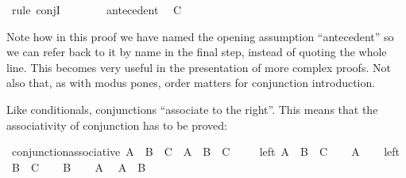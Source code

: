 \begin{isabellebody}
\ {\isacharparenleft}rule\ conjI{\isacharparenright}\isanewline
\ \ \ \ \ \ \isamarkupfalse%
\ antecedent\ \isamarkupfalse%
\ {\isachardoublequoteopen}C{\isachardoublequoteclose}\isacommand{{\isachardot}{\isachardot}}\isamarkupfalse%
\isanewline
\ \ \ \ \isamarkupfalse%
\isanewline
\ \ \isamarkupfalse%
\isanewline
{}\isamarkupfalse%
%
\endisatagproof
{\isafoldproof}%
%
\isadelimproof
%
\endisadelimproof
%
\begin{isamarkuptext}%
Note how in this proof we have named the opening assumption ``antecedent'' so we can refer
back to it by name in the final step, instead of quoting the whole line. This becomes very useful in
the presentation of more complex proofs. Not also that, as with modus pones, order matters for
conjunction introduction.%
\end{isamarkuptext}\isamarkuptrue%
%
\begin{isamarkuptext}%
Like conditionals, conjunctions ``associate to the right''. This means that the associativity
of conjunction has to be proved:%
\end{isamarkuptext}\isamarkuptrue%
\isamarkupfalse%
\ conjunction{\isacharunderscore}associative{\isacharcolon}\ {\isachardoublequoteopen}A\ {\isasymand}\ B\ {\isasymand}\ C\ {\isasymlongleftrightarrow}\ {\isacharparenleft}A\ {\isasymand}\ B{\isacharparenright}\ {\isasymand}\ C{\isachardoublequoteclose}\ \isanewline
%
\isadelimproof
%
\endisadelimproof
%
\isatagproof
{}\isamarkupfalse%
\isanewline
\ \ \isamarkupfalse%
\ left{\isacharcolon}\ {\isachardoublequoteopen}A\ {\isasymand}\ B\ {\isasymand}\ C{\isachardoublequoteclose}\isanewline
\ \ \isamarkupfalse%
\ {\isachardoublequoteopen}A{\isachardoublequoteclose}\isacommand{{\isachardot}{\isachardot}}\isamarkupfalse%
\isanewline
\ \ \isamarkupfalse%
\ left\ \isamarkupfalse%
\ {\isachardoublequoteopen}B\ {\isasymand}\ C{\isachardoublequoteclose}\isacommand{{\isachardot}{\isachardot}}\isamarkupfalse%
\isanewline
\ \ \isamarkupfalse%
\ {\isachardoublequoteopen}B{\isachardoublequoteclose}\isacommand{{\isachardot}{\isachardot}}\isamarkupfalse%
\isanewline
\ \ \isamarkupfalse%
\ {\isacharbackquoteopen}A{\isacharbackquoteclose}\ \isamarkupfalse%
\ {\isachardoublequoteopen}A\ {\isasymand}\ B{\isachardoublequoteclose}\isacommand{{\isachardot}{\isachardot}}\isamarkupfalse%
\isanewline
\ \ \isamarkupfalse%

\end{isabellebody}

